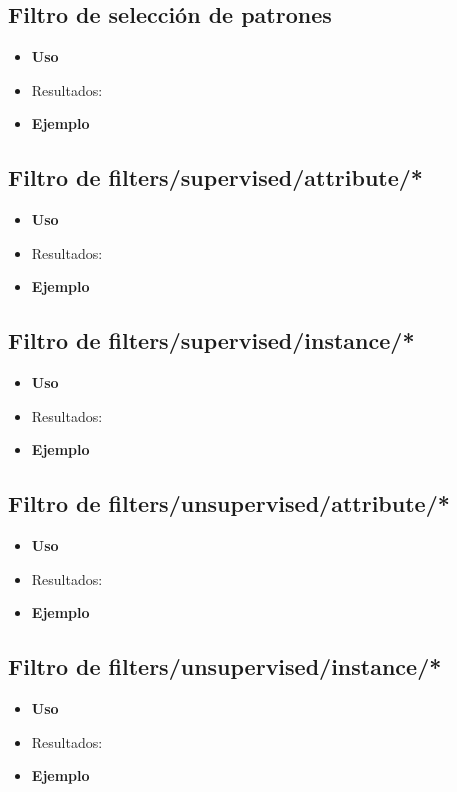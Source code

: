 	\subsection{Filtro de selección de patrones}
	\begin{itemize}
		\item \textbf{Uso}
		\item Resultados:
		\item \textbf{Ejemplo}
	\end{itemize}

	\subsection{Filtro de filters/supervised/attribute/*}
	\begin{itemize}
		\item \textbf{Uso}
		\item Resultados:
		\item \textbf{Ejemplo}
	\end{itemize}

	\subsection{Filtro de filters/supervised/instance/*}
	\begin{itemize}
		\item \textbf{Uso}
		\item Resultados:
		\item \textbf{Ejemplo}
	\end{itemize}

	\subsection{Filtro de filters/unsupervised/attribute/*}
	\begin{itemize}
		\item \textbf{Uso}
		\item Resultados:
		\item \textbf{Ejemplo}
	\end{itemize}

	\subsection{Filtro de filters/unsupervised/instance/*}
	\begin{itemize}
		\item \textbf{Uso}
		\item Resultados:
		\item \textbf{Ejemplo}
	\end{itemize}




